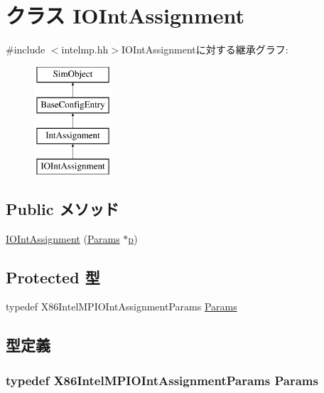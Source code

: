\hypertarget{classX86ISA_1_1IntelMP_1_1IOIntAssignment}{
\section{クラス IOIntAssignment}
\label{classX86ISA_1_1IntelMP_1_1IOIntAssignment}
}


{\ttfamily \#include $<$intelmp.hh$>$}IOIntAssignmentに対する継承グラフ:\begin{figure}[H]
\begin{center}
\leavevmode
\includegraphics[height=4cm]{classX86ISA_1_1IntelMP_1_1IOIntAssignment}
\end{center}
\end{figure}
\subsection*{Public メソッド}
\begin{DoxyCompactItemize}
\item 
\hyperlink{classX86ISA_1_1IntelMP_1_1IOIntAssignment_afc9ea941f070e7f180f6c09872d4a1ab}{IOIntAssignment} (\hyperlink{classX86ISA_1_1IntelMP_1_1IOIntAssignment_a1daa68f47cbaf83ea77c5f815d373bdf}{Params} $\ast$\hyperlink{namespaceX86ISA_af675c1d542a25b96e11164b80809a856}{p})
\end{DoxyCompactItemize}
\subsection*{Protected 型}
\begin{DoxyCompactItemize}
\item 
typedef X86IntelMPIOIntAssignmentParams \hyperlink{classX86ISA_1_1IntelMP_1_1IOIntAssignment_a1daa68f47cbaf83ea77c5f815d373bdf}{Params}
\end{DoxyCompactItemize}


\subsection{型定義}
\hypertarget{classX86ISA_1_1IntelMP_1_1IOIntAssignment_a1daa68f47cbaf83ea77c5f815d373bdf}{
\subsubsection[{Params}]{\setlength{\rightskip}{0pt plus 5cm}typedef X86IntelMPIOIntAssignmentParams {\bf Params}}}
\label{classX86ISA_1_1IntelMP_1_1IOIntAssignment_a1daa68f47cbaf83ea77c5f815d373bdf}


